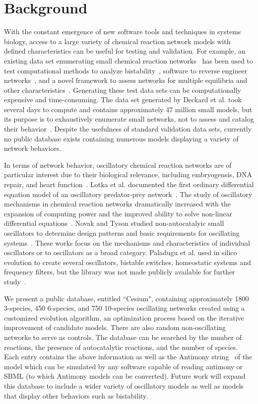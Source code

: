 \documentclass[12pt]{report}
\begin{document}
\section{Background}
With the constant emergence of new software tools and techniques in systems biology, access to a large variety of chemical reaction network models with defined characteristics can be useful for testing and validation. For example, an existing data set enumerating small chemical reaction networks~\cite{deckard2009} has been used to test computational methods to analyze bistability~\cite{pantea2010}, software to reverse engineer networks~\cite{nobile2013}, and a novel framework to assess networks for multiple equilibria and other characteristics~\cite{donnell2014}. Generating these test data sets can be computationally expensive and time-consuming. The data set generated by Deckard et al. took several days to compute and contains approximately 47 million small models, but its purpose is to exhaustively enumerate small networks, not to assess and catalog their behavior~\cite{deckard2009}.  Despite the usefulness of standard validation data sets, currently no public database exists containing numerous models displaying a variety of network behaviors.

In terms of network behavior, oscillatory chemical reaction networks are of particular interest due to their biological relevance, including embryogensis, DNA repair, and heart function~\cite{Novak2008,Aulehla2008,GevaZatorsky2006, Pol1928}. Lotka et al. documented the first ordinary differential equation model of an oscillatory predator-prey network~\cite{Lotka1910}. The study of oscillatory mechanisms in chemical reaction networks dramatically increased with the expansion of computing power and the improved ability to solve non-linear differential equations~\cite{Higgins1967}. Novak and Tyson studied non-autocatalyic small oscillators to determine design patterns and basic requirements for oscillating systems~\cite{Novak2008}. These works focus on the mechanisms and characteristics of individual oscillators or to oscillators as a broad category. Paladugu et al. used in silico evolution to create several oscillators, bistable switches, homeostatic systems and frequency filters, but the library was not made publicly available for further study~\cite{Paladugu2006}. 

We present a public database, entitled ``Cesium",  containing approximately 1800 3-species, 450 6-species, and 750 10-species oscillating networks created using a customized evolution algorithm, an optimization process based on the iterative improvement of candidate models. There are also random non-oscillating networks to serve as controls. The database can be searched by the number of reactions, the presence of autocatalytic reactions, and the number of species. Each entry contains the above information as well as the Antimony string~\cite{Smith2009} of the model which can be simulated by any software capable of reading antimony or SBML (to which Antimony models can be converted). Future work will expand this database to include a wider variety of oscillatory models as well as models that display other behaviors such as bistability. 
\end{document}
